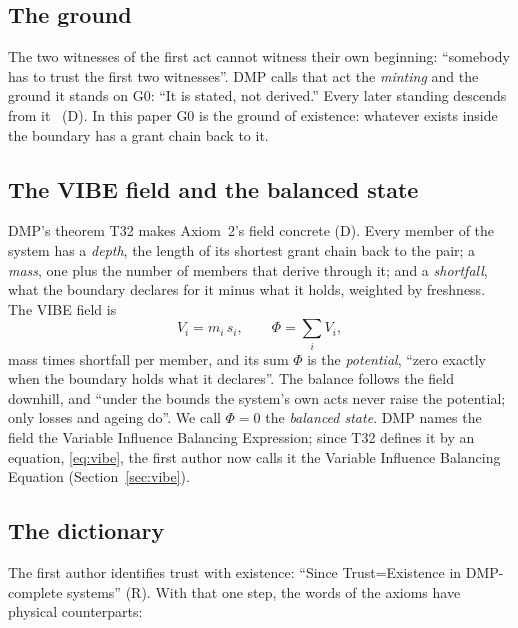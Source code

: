 \documentclass[11pt,a4paper]{article}
\theoremstyle{definition}
\newcommand{\tagD}{\textsf{(D)}}
\newcommand{\tagR}{\textsf{(R)}}
\begin{document}
\subsection{The ground}

The two witnesses of the first act cannot witness their own beginning: ``somebody has to trust the first two witnesses''. DMP calls that
act the \emph{minting} and the ground it stands on G0: ``It is stated, not derived.'' Every later standing descends from it~\cite{dmp}
\tagD. In this paper G0 is the ground of existence: whatever exists inside the boundary has a grant chain back to it.

\subsection{The VIBE field and the balanced state}

DMP's theorem T32 makes Axiom~2's field concrete \tagD. Every member of the system has a \emph{depth}, the length of its shortest grant chain
back to the pair; a \emph{mass}, one plus the number of members that derive through it; and a \emph{shortfall}, what the boundary declares
for it minus what it holds, weighted by freshness. The VIBE field is
\begin{equation}\label{eq:vibe}
V_i=m_i\,s_i,\qquad \Phi=\sum_i V_i,
\end{equation}
mass times shortfall per member, and its sum $\Phi$ is the \emph{potential}, ``zero exactly when the boundary holds what it declares''. The
balance follows the field downhill, and ``under the bounds the system's own acts never raise the potential; only losses and ageing do''.
We call $\Phi=0$ the \emph{balanced state}. DMP names the field the Variable Influence Balancing Expression; since T32 defines it by
an equation, \eqref{eq:vibe}, the first author now calls it the Variable Influence Balancing Equation (Section~\ref{sec:vibe}).

\subsection{The dictionary}

The first author identifies trust with existence: ``Since Trust=Existence in DMP-complete systems'' \tagR. With that one step, the
words of the axioms have physical counterparts:
\end{document}
